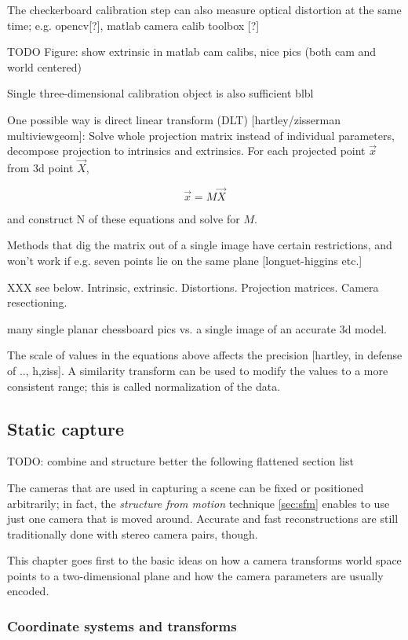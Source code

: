 The checkerboard calibration step can also measure optical distortion at the same time; e.g. opencv[?], matlab camera calib toolbox [?]

TODO Figure: show extrinsic in matlab cam calibs, nice pics (both cam and world centered)

Single three-dimensional calibration object is also sufficient blbl

One possible way is direct linear transform (DLT) [hartley/zisserman multiviewgeom]: Solve whole projection matrix instead of individual parameters, decompose projection to intrinsics and extrinsics. For each projected point $\vec x$ from 3d point $\vec X$,

\[
	\vec x = M \vec X
\]

and construct N of these equations and solve for $M$.

Methods that dig the matrix out of a single image have certain restrictions, and won't work if e.g. seven points lie on the same plane [longuet-higgins etc.]

XXX see below. Intrinsic, extrinsic. Distortions. Projection matrices. Camera resectioning.

many single planar chessboard pics vs. a single image of an accurate 3d model.

The scale of values in the equations above affects the precision [hartley, in defense of .., h,ziss]. A similarity transform can be used to modify the values to a more consistent range; this is called normalization of the data.

\subsection{Static capture}

TODO: combine and structure better the following flattened section list

The cameras that are used in capturing a scene can be fixed or positioned arbitrarily; in fact, the \textit{structure from motion} technique \ref{sec:sfm} enables to use just one camera that is moved around. Accurate and fast reconstructions are still traditionally done with stereo camera pairs, though.

This chapter goes first to the basic ideas on how a camera transforms world space points to a two-dimensional plane and how the camera parameters are usually encoded.

\subsubsection{Coordinate systems and transforms}

